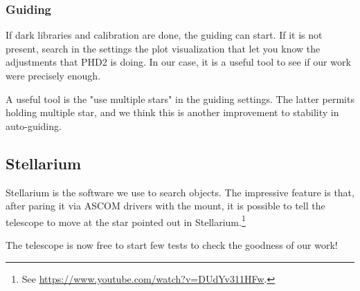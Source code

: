 \subsubsection{Guiding}
If dark libraries and calibration are done, the guiding can start.
If it is not present, search in the settings the plot visualization that let you know the adjustments that PHD2 is doing.
In our case, it is a useful tool to see if our work were precisely enough.        

A useful tool is the "use multiple stars" in the guiding settings.
The latter permits holding multiple star, and we think this is another improvement to stability in auto-guiding.


\subsection{Stellarium}
Stellarium is the software we use to search objects.
The impressive feature is that, after paring it via ASCOM drivers with the mount, it is possible to tell the telescope to move at the star pointed out in Stellarium.\footnote{See \url{https://www.youtube.com/watch?v=DUdYv311HFw}.}

The telescope is now free to start few tests to check the goodness of our work!